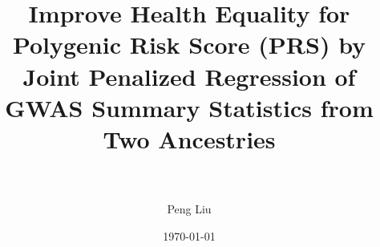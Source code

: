 \documentclass{beamer}
\title[PRS project]{Improve Health Equality for Polygenic Risk Score (PRS) by Joint Penalized Regression of GWAS Summary Statistics from Two Ancestries} %
\author [PL] { \\ \vspace{0.5cm} \\Peng Liu} %
\institute[Merck]{%
\\Biostatistics \& Research Decision Sciences\\ Merck Research Laboratories}
\date{\today} %
\begin{document}
\begin{frame}
\titlepage %
\end{frame}



\end{document}
